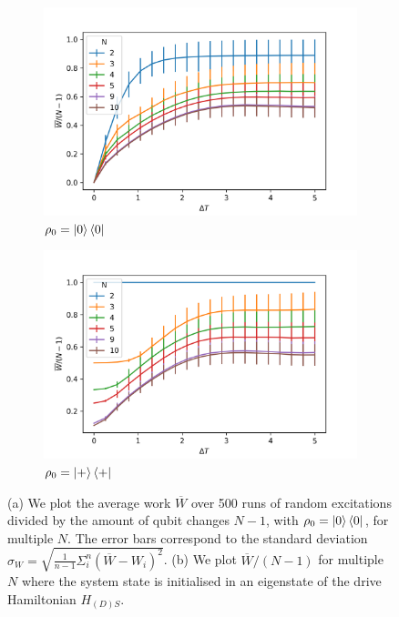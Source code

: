 \begin{figure}[h]
	\centering
	\begin{subfigure}{0.4\textwidth}
		\centering
		\includegraphics[width=\textwidth]{img/dt_0}
		\caption{$\rho_0 = \ket{0}\bra{0}$}
		\label{dt_0}
	\end{subfigure}
	\begin{subfigure}{0.4\textwidth}
	\centering
	\includegraphics[width=\textwidth]{img/dt_eigen}
	\caption{$\rho_0 = \ket{+}\bra{+}$}
	\label{dt_eigen}
	\end{subfigure}
	\caption{(a) We plot the average work $\overline{W}$ over 500 runs of random excitations divided by the amount of qubit changes $N - 1$, with $\rho_0 = \ket{0}\bra{0}$, for multiple $N$. The error bars correspond to the standard deviation $\sigma_{W} = \sqrt{\frac{1}{n-1} \Sigma_i^n (\overline{W} - W_i)^2}$.
	(b) We plot $\overline{W}/(N-1)$ for multiple $N$ where the system state is initialised in an eigenstate of the drive Hamiltonian $H_{(D)S}$.}
	\label{dt_dep}
\end{figure}